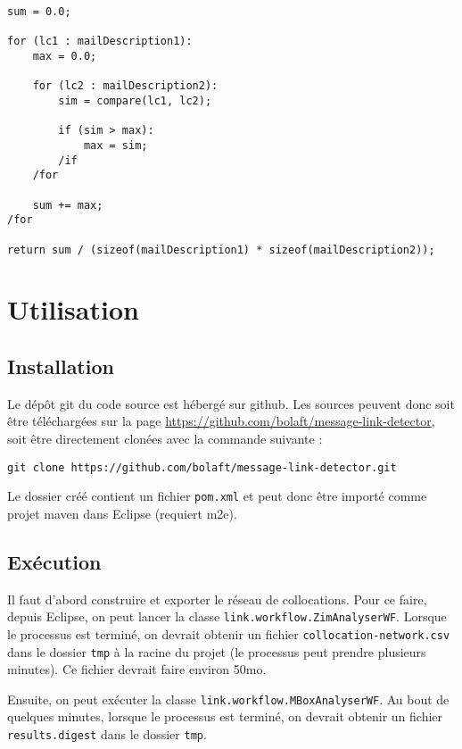 \documentclass[a4paper]{article}
\begin{document}
\begin{lstlisting}
sum = 0.0;

for (lc1 : mailDescription1):
	max = 0.0;
	
	for (lc2 : mailDescription2):
		sim = compare(lc1, lc2);
		
		if (sim > max):
			max = sim;
		/if
	/for
	
	sum += max;
/for

return sum / (sizeof(mailDescription1) * sizeof(mailDescription2));
\end{lstlisting}

\section{Utilisation}

\subsection{Installation}

Le dépôt git du code source est hébergé sur github. Les sources peuvent donc soit être téléchargées sur la page \url{https://github.com/bolaft/message-link-detector}, soit être directement clonées avec la commande suivante :\newline

\texttt{git clone https://github.com/bolaft/message-link-detector.git}\newline

Le dossier créé contient un fichier \texttt{pom.xml} et peut donc être importé comme projet maven dans Eclipse (requiert m2e).

\subsection{Exécution}

Il faut d'abord construire et exporter le réseau de collocations. Pour ce faire, depuis Eclipse, on peut lancer la classe \texttt{link.workflow.ZimAnalyserWF}. Lorsque le processus est terminé, on devrait obtenir un fichier \texttt{collocation-network.csv} dans le dossier \texttt{tmp} à la racine du projet (le processus peut prendre plusieurs minutes). Ce fichier devrait faire environ 50mo.\newline

Ensuite, on peut exécuter la classe \texttt{link.workflow.MBoxAnalyserWF}. Au bout de quelques minutes, lorsque le processus est terminé, on devrait obtenir un fichier \texttt{results.digest} dans le dossier \texttt{tmp}.
\end{document}
